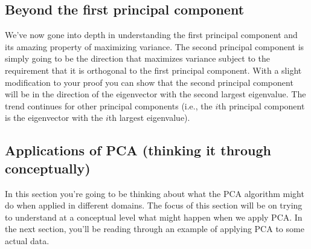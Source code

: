 \subsection{Beyond the first principal component}

We've now gone into depth in understanding the first principal component and its amazing property of maximizing variance.  The second principal component is simply going to be the direction that maximizes variance subject to the requirement that it is orthogonal to the first principal component.  With a slight modification to your proof you can show that the second principal component will be in the direction of the eigenvector with the second largest eigenvalue.  The trend continues for other principal components (i.e., the $i$th principal component is the eigenvector with the $i$th largest eigenvalue).

\subsection{Applications of PCA (thinking it through conceptually)}

In this section you're going to be thinking about what the PCA algorithm might do when applied in different domains.  The focus of this section will be on trying to understand at a conceptual level what might happen when we apply PCA.  In the next section, you'll be reading through an example of applying PCA to some actual data.

